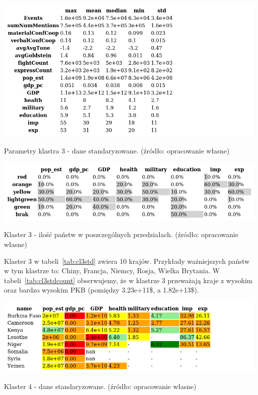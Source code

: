 \documentclass[11pt]{report}
\begin{document}
    \begin{table}[!htp]
        \centering
        \includegraphics[width=\linewidth]{tables/CLUST/desc/clust3std_desc.png}
        \caption{Parametry klastra 3 - dane standaryzowane. (źródło: opracowanie własne)}
        \label{tab:cl3std_desc}
    \end{table}

    \begin{table}[!htp]
        \centering
        \includegraphics[width=\linewidth]{tables/CLUST/cluster3stdkmeanscount.png}
        \caption{Klaster 3 - ilość państw w poszczególnych przedziałach. (źródło: opracowanie własne)}
        \label{tab:cl3stdcount}
    \end{table}

    Klaster 3 w tabeli~\ref{tab:cl3std} zwiera 10 krajów.
    Przykłady ważniejszych państw w tym klastrze to: Chiny, Francja, Niemcy, Rosja, Wielka Brytania.
    W tabeli~\ref{tab:cl3stdcount} obserwujemy, że w klastrze 3 przeważają kraje z wysokim oraz bardzo wysokim PKB (pomiędzy 3.23e+11\$, a 1.82e+13\$).

    \begin{table}[!htp]
        \centering
        \includegraphics[width=\linewidth]{tables/CLUST/cluster4stdkmeans.png}
        \caption{Klaster 4 - dane standaryzowane. (źródło: opracowanie własne)}
        \label{tab:cl4std}
    \end{table}
\end{document}
